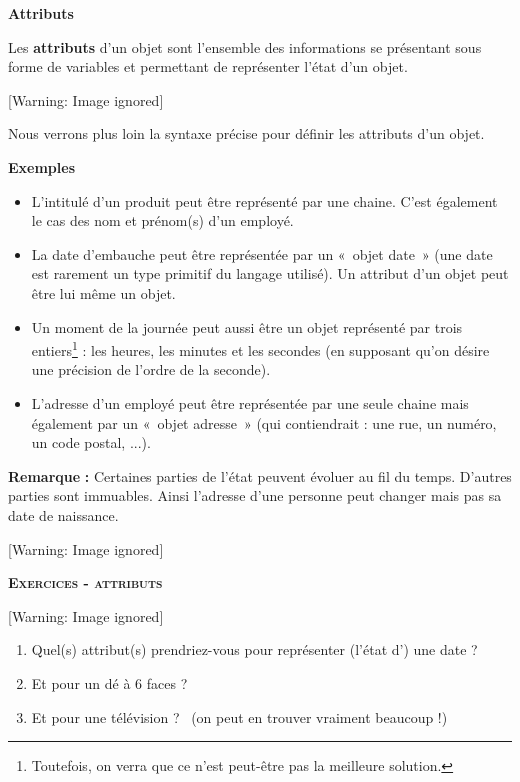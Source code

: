 {\sffamily\bfseries\upshape
Attributs}

{
Les \textbf{attributs} d'un objet sont
l'ensemble des informations se présentant sous forme
de variables et permettant de représenter l'état
d'un objet.}

\begin{center}
 [Warning: Image ignored] %

\end{center}
{
Nous verrons plus loin la syntaxe précise pour définir les attributs
d'un objet.}

{
\textbf{Exemples} }

\liststyleListv
\begin{itemize}
\item {
L'intitulé d'un produit peut être
représenté par une chaine. C'est également le cas des
nom et prénom(s) d'un employé.}
\item {
La date d'embauche peut être représentée par un «~objet
date~» (une date est rarement un type primitif du langage utilisé). Un
attribut d'un objet peut être lui même un objet.}
\item {
Un moment de la journée peut aussi être un objet représenté par trois
entiers\footnote{Toutefois, on verra que ce n'est
peut-être pas la meilleure solution.} : les heures, les minutes et les
secondes (en supposant qu'on désire une précision de
l'ordre de la seconde).}
\item {
L'adresse d'un employé peut être
représentée par une seule chaine mais également par un «~objet
adresse~» (qui contiendrait : une rue, un numéro, un code postal,
...).}
\end{itemize}
{
\textbf{Remarque}\textbf{ : }Certaines parties de
l'état peuvent évoluer au fil du temps.
D'autres parties sont immuables. Ainsi
l'adresse d'une personne peut changer
mais pas sa date de naissance. }

\begin{center}
 [Warning: Image ignored] %

\end{center}
{\sffamily\bfseries\scshape
Exercices - attributs}

\begin{center}
 [Warning: Image ignored] %

\end{center}
\liststyleWWviiiNumi
\begin{enumerate}
\item {
Quel(s) attribut(s) prendriez-vous pour représenter
(l'état d') une date ?}
\item {
Et pour un dé à 6 faces ?}
\item {
Et pour une télévision ? \ (on peut en trouver vraiment beaucoup !)}
\end{enumerate}

